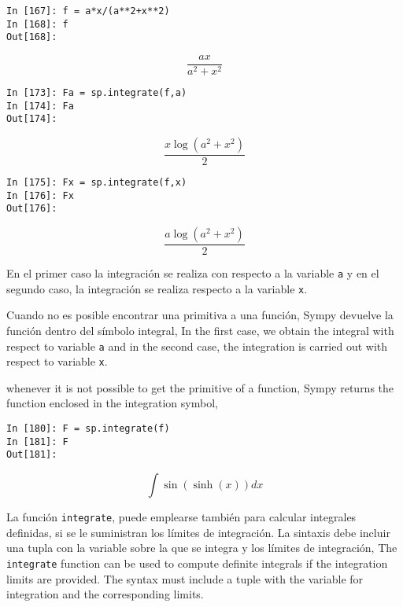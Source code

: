 \begin{center}
	\begin{minipage}{.5\textwidth}
		\begin{verbatim}
In [167]: f = a*x/(a**2+x**2)
In [168]: f
Out[168]: 
		\end{verbatim}
		\begin{equation*}
			\frac{ax}{a^2+x^2}
		\end{equation*}
		\begin{verbatim}
In [173]: Fa = sp.integrate(f,a)
In [174]: Fa
Out[174]: 
		\end{verbatim}
		\begin{equation*}
			\frac{x\log(a^2+x^2)}{2}
		\end{equation*}
				\begin{verbatim}
In [175]: Fx = sp.integrate(f,x)
In [176]: Fx
Out[176]:
		\end{verbatim}
		\begin{equation*}
			\frac{a\log(a^2+x^2)}{2}
		\end{equation*}
	\end{minipage}
\end{center}
\begin{paracol}{2}
En el primer caso la integración se realiza con respecto a la variable \texttt{a} y en el segundo caso, la integración se realiza respecto a la variable \texttt{x}.

Cuando no es posible encontrar una primitiva a una función, Sympy devuelve la función dentro del símbolo integral,
\switchcolumn
In the first case, we obtain the integral with respect to variable \texttt{a} and in the second case, the integration is carried out with respect to variable \texttt{x}. 

whenever it is not possible to get the primitive of a function, Sympy returns the function enclosed in the integration symbol,
\end{paracol}
\begin{center}
	\begin{minipage}{.5\textwidth}
		\begin{verbatim}
In [180]: F = sp.integrate(f)
In [181]: F
Out[181]:  
		\end{verbatim}
		\begin{equation*}\int \sin(\sinh(x))dx \end{equation*}
	\end{minipage}
\end{center}
\begin{paracol}{2}
La función \texttt{integrate}, puede emplearse también para calcular integrales definidas, si se le suministran los límites de integración. La sintaxis debe incluir una tupla con la variable sobre la que se integra y los límites de integración,
\switchcolumn
The \texttt{integrate} function can be used to compute definite integrals if the integration limits are provided. The syntax must include a tuple with the variable for integration and the corresponding limits.
\end{paracol}

